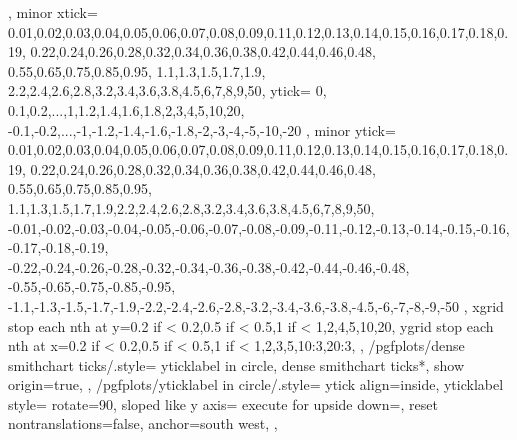 {{{		},
		minor xtick={%
			0.01,0.02,0.03,0.04,0.05,0.06,0.07,0.08,0.09,0.11,0.12,0.13,0.14,0.15,0.16,0.17,0.18,0.19,%
			0.22,0.24,0.26,0.28,0.32,0.34,0.36,0.38,0.42,0.44,0.46,0.48,%
			0.55,0.65,0.75,0.85,0.95,%
			1.1,1.3,1.5,1.7,1.9,%
			2.2,2.4,2.6,2.8,3.2,3.4,3.6,3.8,4.5,6,7,8,9,50},
		ytick={%
			0,%
			0.1,0.2,...,1,1.2,1.4,1.6,1.8,2,3,4,5,10,20,%
			-0.1,-0.2,...,-1,-1.2,-1.4,-1.6,-1.8,-2,-3,-4,-5,-10,-20%
		},
		minor ytick={%
			0.01,0.02,0.03,0.04,0.05,0.06,0.07,0.08,0.09,0.11,0.12,0.13,0.14,0.15,0.16,0.17,0.18,0.19,%
			0.22,0.24,0.26,0.28,0.32,0.34,0.36,0.38,0.42,0.44,0.46,0.48,%
			0.55,0.65,0.75,0.85,0.95,%
			1.1,1.3,1.5,1.7,1.9,2.2,2.4,2.6,2.8,3.2,3.4,3.6,3.8,4.5,6,7,8,9,50,%
			-0.01,-0.02,-0.03,-0.04,-0.05,-0.06,-0.07,-0.08,-0.09,-0.11,-0.12,-0.13,-0.14,-0.15,-0.16,-0.17,-0.18,-0.19,%
			-0.22,-0.24,-0.26,-0.28,-0.32,-0.34,-0.36,-0.38,-0.42,-0.44,-0.46,-0.48,%
			-0.55,-0.65,-0.75,-0.85,-0.95,%
			-1.1,-1.3,-1.5,-1.7,-1.9,-2.2,-2.4,-2.6,-2.8,-3.2,-3.4,-3.6,-3.8,-4.5,-6,-7,-8,-9,-50%
		},
		xgrid stop each nth at y={0.2 if < 0.2,0.5 if < 0.5,1 if < 1,2,4,5,10,20},
		ygrid stop each nth at x={0.2 if < 0.2,0.5 if < 0.5,1 if < 1,2,3,5,10:3,20:3},
	},
	/pgfplots/dense smithchart ticks/.style={
		yticklabel in circle,
		dense smithchart ticks*,
		show origin=true,
	},
	/pgfplots/yticklabel in circle/.style={
		ytick align=inside,
		yticklabel style={
			rotate=90,
			sloped like y axis={%
				execute for upside down={\tikzset{anchor=north east}},
				reset nontranslations=false},
			anchor=south west,
		}
	},
}

